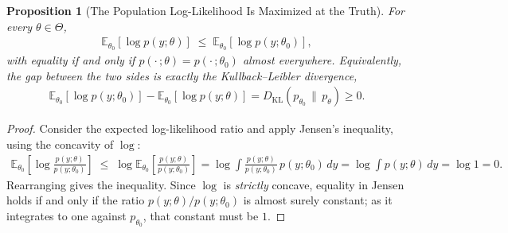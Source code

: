 \documentclass[11pt]{article}
\theoremstyle{definition}
\theoremstyle{plain}
\newtheorem{proposition}{Proposition}[section]
\theoremstyle{remark}
\begin{document}
\begin{proposition}[The Population Log-Likelihood Is Maximized at the Truth]\label{prop:kl-max}
    For every $\theta \in \Theta$,
    \begin{align}
        \mathbb{E}_{\theta_0}\!\left[\log p(y;\theta)\right] \;\leq\; \mathbb{E}_{\theta_0}\!\left[\log p(y;\theta_0)\right],
    \end{align}
    with equality if and only if $p(\cdot\,;\theta) = p(\cdot\,;\theta_0)$ almost everywhere. Equivalently, the gap between the two sides is exactly the Kullback--Leibler divergence,
    \begin{align}
        \mathbb{E}_{\theta_0}\!\left[\log p(y;\theta_0)\right] - \mathbb{E}_{\theta_0}\!\left[\log p(y;\theta)\right] = D_{\mathrm{KL}}\!\left(p_{\theta_0} \,\|\, p_\theta\right) \geq 0.
    \end{align}
\end{proposition}
\begin{proof}
    Consider the expected log-likelihood ratio and apply Jensen's inequality, using the concavity of $\log$:
    \begin{align}
        \mathbb{E}_{\theta_0}\!\left[\log \frac{p(y;\theta)}{p(y;\theta_0)}\right]
        \;\leq\; \log \mathbb{E}_{\theta_0}\!\left[\frac{p(y;\theta)}{p(y;\theta_0)}\right]
        = \log \int \frac{p(y;\theta)}{p(y;\theta_0)}\,p(y;\theta_0)\,dy
        = \log \int p(y;\theta)\,dy = \log 1 = 0.
    \end{align}
    Rearranging gives the inequality. Since $\log$ is \emph{strictly} concave, equality in Jensen holds if and only if the ratio $p(y;\theta)/p(y;\theta_0)$ is almost surely constant; as it integrates to one against $p_{\theta_0}$, that constant must be $1$.
\end{proof}
\end{document}
